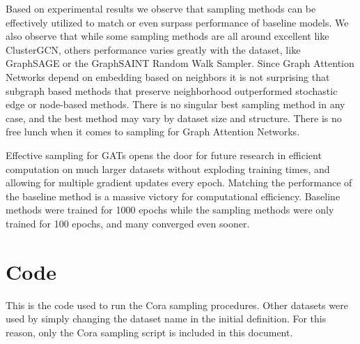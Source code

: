 \documentclass{article}
\begin{document}
	Based on experimental results we observe that sampling methods can be effectively utilized to match or even surpass performance of baseline models. We also observe that while some sampling methods are all around excellent like ClusterGCN, others performance varies greatly with the dataset, like GraphSAGE or the GraphSAINT Random Walk Sampler. Since Graph Attention Networks depend on embedding based on neighbors it is not surprising that subgraph based methods that preserve neighborhood outperformed stochastic edge or node-based methods. There is no singular best sampling method in any case, and the best method may vary by dataset size and structure. There is no free lunch when it comes to sampling for Graph Attention Networks. 
	
	Effective sampling for GATs opens the door for future research in efficient computation on much larger datasets without exploding training times, and allowing for multiple gradient updates every epoch. Matching the performance of the baseline method is a massive victory for computational efficiency. Baseline methods were trained for 1000 epochs while the sampling methods were only trained for 100 epochs, and many converged even sooner. 
	
	\nocite{*}
	\pagebreak
	
	
	

	\pagebreak
	\appendix
	\section{Code}
	This is the code used to run the Cora sampling procedures. Other datasets were used by simply changing the dataset name in the initial definition. For this reason, only the Cora sampling script is included in this document. 
	
	

	
\end{document}
